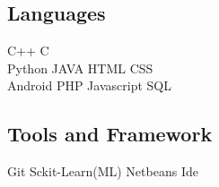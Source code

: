 \documentclass[]{deedy-resume-openfont}
\begin{document}
\begin{minipage}[t]{0.33\textwidth}
\subsection{Languages}
C++ \textbullet{}   C  \\
Python \textbullet{} JAVA\textbullet{} HTML \textbullet{} CSS\\
Android \textbullet{} PHP \textbullet{} Javascript\textbullet{} SQL
\sectionsep

\subsection{Tools and Framework}
Git\textbullet{} Sckit-Learn(ML) \textbullet{} Netbeans Ide
\sectionsep

%
%

\end{minipage} 
\hfill
\end{document}
